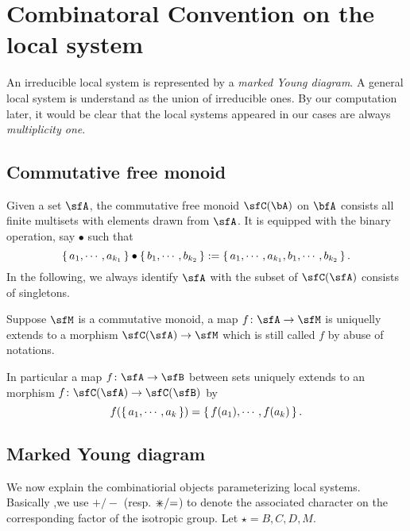 \documentclass[12pt,a4paper]{amsart}
\numberwithin{equation}{section}
\theoremstyle{remark}
\def\dliftv{\vartheta}
\def\umm{{=}}
\def\upp{{\ast}}
\def\upp{
  {{\setbox0\hbox{$\times$}
      \rlap{\hbox to \wd0{\hss$+$\hss}}\box0
    }}
}
\begin{document}




\section{Combinatoral Convention on the local system}
An irreducible local system is represented by a {\emph{marked Young
    diagram}}. A general local system is understand as the
union of irreducible ones. By our computation later, it would be clear that the
local systems appeared in our cases are always \emph{multiplicity one}.


\subsection{Commutative free monoid}
Given a  set $\sfA$, the commutative free monoid $\sfC(\bA)$ on $\bfA$ consists all finite multisets with
elements drawn from $\sfA$.
It is equipped with the binary operation, say $\bullet$ such that
\[
  \set{a_{1},\cdots, a_{k_{1}}}\bullet \set{b_{1},\cdots, b_{k_{2}}} :=
  \set{a_{1},\cdots, a_{k_{1}},b_{1},\cdots, b_{k_{2}}}.
\]
In the following, we always identify $\sfA$ with the subset of $\sfC(\sfA)$
consists of singletons.

Suppose $\sfM$ is a commutative monoid, a map $f\colon \sfA\rightarrow \sfM$ is
uniquelly extends to a morphism $\sfC(\sfA)\rightarrow \sfM$ which is still
called $f$ by abuse of notations.

In particular a map $f\colon \sfA\rightarrow \sfB$ between sets uniquely extends to an morphism
$f\colon \sfC(\sfA)\rightarrow \sfC(\sfB)$ by
\[
  f(\set{a_{1},\cdots, a_{k}}) = \set{f(a_{1}), \cdots, f(a_{k})}.
\]

\subsection{Marked Young diagram}
We now explain the combinatiorial objects parameterizing local systems.
Basically ,we use $+/-$ (resp. $\upp/\umm$) to denote the associated character on the
corresponding factor of the isotropic group.
Let $\star=B,C,D,M$.
\end{document}
